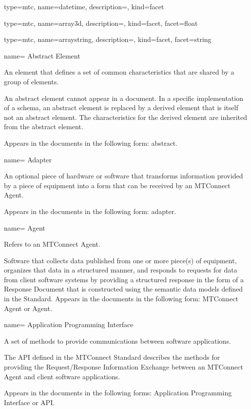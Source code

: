 {
  type=mtc,
  name={datetime},
  description={},
  kind={facet}
}


{
  type=mtc,
  name={array3d},
  description={},
  kind={facet},
  facet={\gls{float}}
}

{
  type=mtc,
  name={arraystring},
  description={},
  kind={facet},
  facet={\gls{string}}
}

{
  name= {Abstract Element}
}
{
  An element that defines a set of common characteristics that are shared by a group of elements.
  
  An abstract element cannot appear in a document. In a specific implementation of a schema, an abstract element is replaced by a derived element that is itself not an abstract element. The characteristics for the derived element are inherited from the abstract element. 
  
  Appears in the documents in the following form: abstract.
}


{
  name= {Adapter}
}
{
  An optional piece of hardware or software that transforms information provided by a piece of equipment into a form that can be received by an MTConnect Agent.

  Appears in the documents in the following form: adapter.
}


{
  name= {Agent}
}
{
  Refers to an MTConnect Agent. 
  
  Software that collects data published from one or more piece(s) of equipment, organizes that data in a structured manner, and responds to requests for data from client software systems by providing a structured response in the form of a Response Document that is constructed using the semantic data models defined in the Standard. 
  Appears in the documents in the following form: MTConnect Agent or Agent.
}


{
  name= {Application Programming Interface}
}
{
  A set of methods to provide communications between software applications.

  The API defined in the MTConnect Standard describes the methods for providing the Request/Response Information Exchange between an MTConnect Agent and client software applications.
  
  Appears in the documents in the following forms: Application Programming Interface or API.
}


